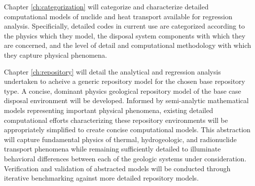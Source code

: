 Chapter \ref{ch:categorization} will categorize and characterize 
detailed computational models of nuclide and heat transport available 
for regression analysis. Specificially, detailed codes in current use 
are categorized according to the physics which they model, the 
disposal system components with which they are concerned, and the 
level of detail and computational methodology with which they capture 
physical phenomena. 

%
Chapter \ref{ch:repository} will detail the analytical and regression 
analysis undertaken to acheive a generic repository model for the 
chosen base repository type. A concise, dominant physics geological 
repository model of the base case disposal environment will be 
developed. Informed by semi-analytic mathematical models representing 
important physical phenomena, existing detailed computational efforts 
characterizing these repository environments will be appropriately 
simplified to create concise computational models. This abstraction 
will capture fundamental physics of thermal, hydrogeologic, and 
radionuclide transport phenomena while remaining sufficiently detailed 
to illuminate behavioral differences between each of the geologic 
systems under consideration.  Verification and validation of 
abstracted models will be conducted through iterative benchmarking 
against more detailed repository models.

% 


